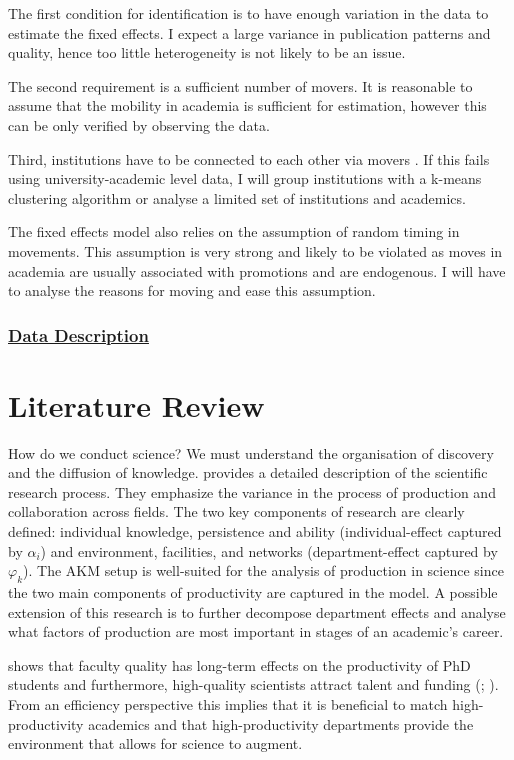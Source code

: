 \documentclass[10pt]{report}
\begin{document}
The first condition for identification is to have enough variation in the data to estimate the fixed effects. I expect a large variance in publication patterns and quality, hence too little heterogeneity is not likely to be an issue.

The second requirement is a sufficient number of movers. It is reasonable to assume that the mobility in academia is sufficient for estimation, however this can be only verified by observing the data. 

Third, institutions have to be connected to each other via movers \parencite{Abowd2002}. If this fails using university-academic level data, I will group institutions with a k-means clustering algorithm \parencite{Bonhomme2019} or analyse a limited set of institutions and academics.

The fixed effects model also relies on the assumption of random timing in movements. This assumption is very strong and likely to be violated as moves in academia are usually associated with promotions and are endogenous. I will have to analyse the reasons for moving and ease this assumption.

\subsubsection*{\hyperref[ssec:data]{Data Description}}

\newpage
\section*{Literature Review}
\label{sec:lit}

How do we conduct science? We must understand the organisation of discovery and the diffusion of knowledge. \textcite{Stephan2012} provides a detailed description of the scientific research process. They emphasize the variance in the process of production and collaboration across fields. The two key components of research are clearly defined: individual knowledge, persistence and ability (individual-effect captured by \(\alpha_i\)) and environment, facilities, and networks (department-effect captured by \(\varphi_k\)). The AKM setup is well-suited for the analysis of production in science since the two main components of productivity are captured in the model. A possible extension of this research is to further decompose department effects and analyse what factors of production are most important in stages of an academic's career.

\textcite{Waldinger2012} shows that faculty quality has long-term effects on the productivity of PhD students and furthermore, high-quality scientists attract talent and funding (\cite{Waldinger2016}; \cite{Azoulay2010}). From an efficiency perspective this implies that it is beneficial to match high-productivity academics and that high-productivity departments provide the environment that allows for science to augment.
\end{document}
